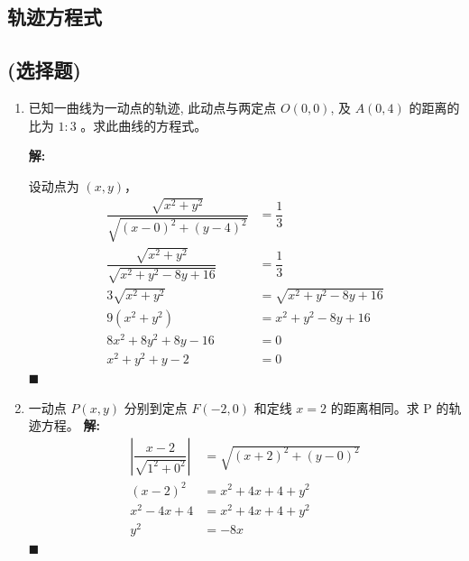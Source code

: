 \documentclass[10pt]{article}
\newcommand{\sol}{\textbf{解:} }
\begin{document}
\subsection{轨迹方程式}
\subsection*{(选择题)}
\begin{enumerate}[leftmargin=*]
  \item 已知一曲线为一动点的轨迹, 此动点与两定点 $O(0,0)$, 及 $A(0,4)$ 的距离的比为 $1: 3$ 。求此曲线的方程式。

        \sol{}

        设动点为 $(x, y)$，
        \begin{align*}
          \dfrac{\sqrt{x^{2}+y^{2}}}{\sqrt{(x-0)^{2}+(y-4)^{2}}} & = \dfrac{1}{3}             \\
          \dfrac{\sqrt{x^{2}+y^{2}}}{\sqrt{x^{2}+y^{2}-8y+16}}   & = \dfrac{1}{3}             \\
          3\sqrt{x^{2}+y^{2}}                                    & = \sqrt{x^{2}+y^{2}-8y+16} \\
          9(x^{2}+y^{2})                                         & = x^{2}+y^{2}-8y+16        \\
          8x^{2}+8y^{2}+8y-16                                    & = 0                        \\
          x^{2}+y^{2}+y-2                                        & = 0
        \end{align*} \hfill$\blacksquare$

  \item 一动点 $P(x, y)$ 分别到定点 $F(-2,0)$ 和定线 $x=2$ 的距离相同。求 P 的轨迹方程。
        \sol{}
        \begin{align*}
          \left\vert \dfrac{x-2}{\sqrt{1^2+0^2}} \right\vert & = \sqrt{(x+2)^2+(y-0)^2} \\
          (x - 2)^2                                          & = x^{2}+4x+4+y^{2}       \\
          x^{2}-4x+4                                         & = x^{2}+4x+4+y^{2}       \\
          y^{2}                                              & = -8x
        \end{align*} \hfill$\blacksquare$
\end{enumerate}
\end{document}
